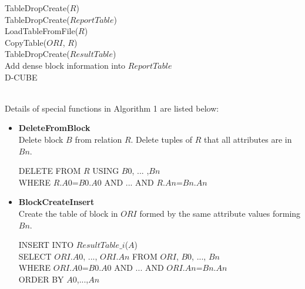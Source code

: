 \begin{algorithm}[H]
\SetAlgoLined
{}
 TableDropCreate($R$)\\
 TableDropCreate($ReportTable$)\\
 LoadTableFromFile($R$)\\
 CopyTable($ORI$, $R$) \\
 TableDropCreate($ResultTable$) \\
 Add dense block information into $ReportTable$ \\
 \caption{D-CUBE}
\end{algorithm}

\\
Details of special functions in Algorithm 1 are listed below:
\begin{itemize}
    \item \textbf{DeleteFromBlock} \\
    Delete block $B$ from relation $R$. Delete tuples of $R$ that all attributes are in $Bn$.
    \begin{algorithmic}
    \STATE DELETE FROM $R$ USING $B0$, ... ,$Bn$ \\
    WHERE $R$.$A0$=$B0$.$A0$ AND ... AND $R$.$An$=$Bn$.$An$
    \end{algorithmic}
    \item \textbf{BlockCreateInsert} \\
    Create the table of block in $ORI$ formed by the same attribute values forming $Bn$.
    \begin{algorithmic}
    \STATE INSERT INTO $ResultTable\_i$($A$) \\
    SELECT $ORI$.$A0$, ..., $ORI$.$An$ FROM $ORI$, $B0$, ..., $Bn$\\
    WHERE $ORI$.$A0$=$B0$.$A0$ AND ... AND $ORI$.$An$=$Bn$.$An$ \\
    ORDER BY $A0$,...,$An$
    \end{algorithmic}
\end{itemize}

